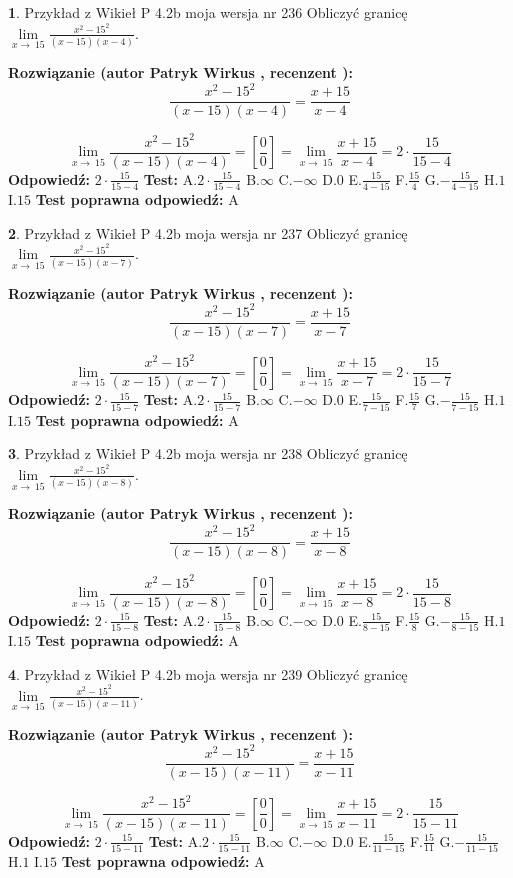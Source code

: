 \documentclass[12pt, a4paper]{article}
\theoremstyle{definition} %
\newtheorem{zad}{}
\newcommand{\zadStart}[1]{\begin{zad}#1\newline}
\newcommand{\zadStop}{\end{zad}}
\newcommand{\rozwStart}[2]{\noindent \textbf{Rozwiązanie (autor #1 , recenzent #2): }\newline}
\newcommand{\rozwStop}{\newline}
\newcommand{\odpStart}{\noindent \textbf{Odpowiedź:}\newline}
\newcommand{\odpStop}{\newline}
\newcommand{\testStart}{\noindent \textbf{Test:}\newline}
\newcommand{\testStop}{\newline}
\newcommand{\kluczStart}{\noindent \textbf{Test poprawna odpowiedź:}\newline}
\newcommand{\kluczStop}{\newline}
\begin{document}
\zadStart{Przykład z Wikieł P 4.2b moja wersja nr 236}
Obliczyć granicę $\lim\limits_{x\to\ 15}\frac{x^{2}-15^{2}}{(x-15)(x-4)}$.
\zadStop
\rozwStart{Patryk Wirkus}{}
$$\frac{x^{2}-15^{2}}{(x-15)(x-4)}=\frac{x+15}{x-4}$$

$$\lim\limits_{x\to\ 15}\frac{x^{2}-15^{2}}{(x-15)(x-4)}=[\frac{0}{0}]=\lim\limits_{x\to\ 15}\frac{x+15}{x-4}=2 \cdot \frac{15}{15-4}$$
\rozwStop
\odpStart
$2 \cdot \frac{15}{15-4}$
\odpStop
\testStart
A.$2 \cdot \frac{15}{15-4}$
B.$\infty$
C.$-\infty$
D.$0$
E.$\frac{15}{4-15}$
F.$\frac{15}{4}$
G.$-\frac{15}{4-15}$
H.$1$
I.$15$
\testStop
\kluczStart
A
\kluczStop



\zadStart{Przykład z Wikieł P 4.2b moja wersja nr 237}
Obliczyć granicę $\lim\limits_{x\to\ 15}\frac{x^{2}-15^{2}}{(x-15)(x-7)}$.
\zadStop
\rozwStart{Patryk Wirkus}{}
$$\frac{x^{2}-15^{2}}{(x-15)(x-7)}=\frac{x+15}{x-7}$$

$$\lim\limits_{x\to\ 15}\frac{x^{2}-15^{2}}{(x-15)(x-7)}=[\frac{0}{0}]=\lim\limits_{x\to\ 15}\frac{x+15}{x-7}=2 \cdot \frac{15}{15-7}$$
\rozwStop
\odpStart
$2 \cdot \frac{15}{15-7}$
\odpStop
\testStart
A.$2 \cdot \frac{15}{15-7}$
B.$\infty$
C.$-\infty$
D.$0$
E.$\frac{15}{7-15}$
F.$\frac{15}{7}$
G.$-\frac{15}{7-15}$
H.$1$
I.$15$
\testStop
\kluczStart
A
\kluczStop



\zadStart{Przykład z Wikieł P 4.2b moja wersja nr 238}
Obliczyć granicę $\lim\limits_{x\to\ 15}\frac{x^{2}-15^{2}}{(x-15)(x-8)}$.
\zadStop
\rozwStart{Patryk Wirkus}{}
$$\frac{x^{2}-15^{2}}{(x-15)(x-8)}=\frac{x+15}{x-8}$$

$$\lim\limits_{x\to\ 15}\frac{x^{2}-15^{2}}{(x-15)(x-8)}=[\frac{0}{0}]=\lim\limits_{x\to\ 15}\frac{x+15}{x-8}=2 \cdot \frac{15}{15-8}$$
\rozwStop
\odpStart
$2 \cdot \frac{15}{15-8}$
\odpStop
\testStart
A.$2 \cdot \frac{15}{15-8}$
B.$\infty$
C.$-\infty$
D.$0$
E.$\frac{15}{8-15}$
F.$\frac{15}{8}$
G.$-\frac{15}{8-15}$
H.$1$
I.$15$
\testStop
\kluczStart
A
\kluczStop



\zadStart{Przykład z Wikieł P 4.2b moja wersja nr 239}
Obliczyć granicę $\lim\limits_{x\to\ 15}\frac{x^{2}-15^{2}}{(x-15)(x-11)}$.
\zadStop
\rozwStart{Patryk Wirkus}{}
$$\frac{x^{2}-15^{2}}{(x-15)(x-11)}=\frac{x+15}{x-11}$$

$$\lim\limits_{x\to\ 15}\frac{x^{2}-15^{2}}{(x-15)(x-11)}=[\frac{0}{0}]=\lim\limits_{x\to\ 15}\frac{x+15}{x-11}=2 \cdot \frac{15}{15-11}$$
\rozwStop
\odpStart
$2 \cdot \frac{15}{15-11}$
\odpStop
\testStart
A.$2 \cdot \frac{15}{15-11}$
B.$\infty$
C.$-\infty$
D.$0$
E.$\frac{15}{11-15}$
F.$\frac{15}{11}$
G.$-\frac{15}{11-15}$
H.$1$
I.$15$
\testStop
\kluczStart
A
\kluczStop
\end{document}

